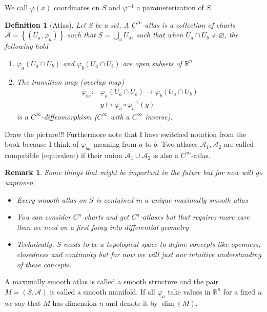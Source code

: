 \documentclass[a4paper]{article}
\newtheorem*{defn}{Definition}
\newtheorem*{rem}{Remark}
\begin{document}
We call $\varphi(x)$ coordinates on $S$ and $\varphi^{-1}$ a parameterization of $S$.

\begin{defn}[Atlas]
  Let $S$ be a set. A $C^\infty$-atlas is a collection of charts $\mathcal{A} = \left\{ (U_a, \varphi_a) \right\}$ such that $S = \bigcup_a U_a$, such that when $U_a \cap U_b \neq \varnothing$, the following hold
  \begin{enumerate}
    \item $\varphi_a(U_a \cap U_b)$ and $\varphi_b(U_a \cap U_b)$ are open subsets of $\mathds{R}^n$
    \item The transition map (overlap map)
      \[
        \begin{aligned}
          \varphi_{ba}:& \varphi_a(U_a \cap U_b) \rightarrow \varphi_b(U_a \cap U_b) \\
                       &y \mapsto \varphi_b \circ \varphi^{-1}_a(y) 
        \end{aligned}
      \]
      is a $C^\infty$-diffeomorphism ($C^\infty$ with a $C^\infty$ inverse).
  \end{enumerate}
\end{defn}

Draw the picture!!! Furthermore note that I have switched notation from the book because I think of $\varphi_{ba}$ meaning from $a$ to $b$. Two atlases $\mathcal{A}_1, \mathcal{A}_2$ are called compatible (equivalent) if their union $\mathcal{A}_1 \cup \mathcal{A}_2$ is also a $C^\infty$-atlas.

\begin{rem}
  Some things that might be important in the future but for now will go unproven
  \begin{itemize}
    \item Every smooth atlas on $S$ is contained in a unique maximally smooth atlas
    \item You can consider $C^n$ charts and get $C^n$-atlases but that requires more care than we need on a first foray into differential geometry
    \item Technically, $S$ needs to be a topological space to define concepts like openness, closedness and continuity but for now we will just our intuitive understanding of these concepts.
  \end{itemize}
\end{rem}

A maximally smooth atlas is called a smooth structure and the pair $M = (S, \mathcal{A})$ is called a smooth manifold. If all $\varphi_a$ take values in $\mathds{R}^n$ for a fixed $n$ we say that $M$ has dimension $n$ and denote it by $\dim(M)$.
\end{document}

